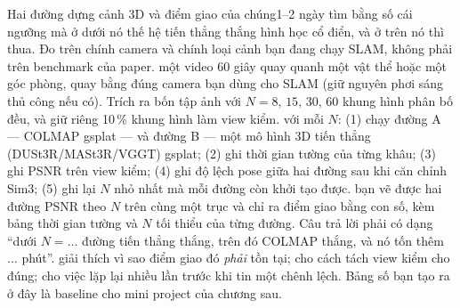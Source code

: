 \documentclass[../../deep_learning.tex]{subfiles}
\begin{document}
\begin{duan}{Hai đường dựng cảnh 3D và điểm giao của chúng}{1--2 ngày}
\dmt tìm bằng số cái ngưỡng mà ở dưới nó thế hệ tiến thẳng thắng hình học cổ điển, và ở trên nó thì thua. Đo trên chính camera và chính loại cảnh bạn đang chạy SLAM, không phải trên benchmark của paper.
\ddl một video 60 giây quay quanh một vật thể hoặc một góc phòng, quay bằng đúng camera bạn dùng cho SLAM (giữ nguyên phơi sáng thủ công nếu có). Trích ra bốn tập ảnh với \(N = 8,\,15,\,30,\,60\) khung hình phân bố đều, và giữ riêng 10\,\% khung hình làm view kiểm.
\dbc với mỗi \(N\): (1) chạy đường A --- COLMAP \ra gsplat --- và đường B --- một mô hình 3D tiến thẳng (DUSt3R/MASt3R/VGGT) \ra gsplat; (2) ghi thời gian tường của từng khâu; (3) ghi PSNR trên view kiểm; (4) ghi độ lệch pose giữa hai đường sau khi căn chỉnh Sim3; (5) ghi lại \(N\) nhỏ nhất mà mỗi đường còn khởi tạo được.
\dxk bạn vẽ được hai đường PSNR theo \(N\) trên cùng một trục và chỉ ra điểm giao bằng con số, kèm bảng thời gian tường và \(N\) tối thiểu của từng đường. Câu trả lời phải có dạng ``dưới \(N=\ldots\) đường tiến thẳng thắng, trên đó COLMAP thắng, và nó tốn thêm \(\ldots\) phút''.
\dnv {} giải thích vì sao điểm giao đó \emph{phải} tồn tại;  cho cách tách view kiểm cho đúng;  cho việc lặp lại nhiều lần trước khi tin một chênh lệch. Bảng số bạn tạo ra ở đây là baseline cho mini project của chương sau.
\end{duan}

\begin{traloi}
\end{traloi}
\end{document}
